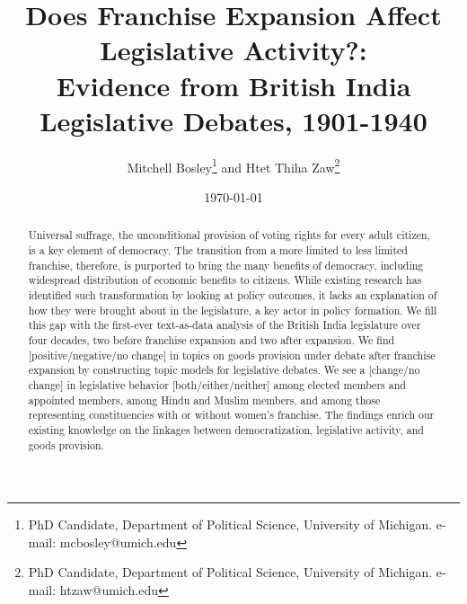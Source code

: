 \documentclass[12pt]{article}
\begin{document}
\begin{titlepage}

\setcounter{page}{1}

\title{\Large Does Franchise Expansion Affect Legislative Activity?:\\ Evidence from British India Legislative Debates, 1901-1940}
\author{Mitchell Bosley\thanks{PhD Candidate, Department of Political Science, University of Michigan. e-mail: mcbosley@umich.edu} and Htet Thiha Zaw\thanks{PhD Candidate, Department of Political Science, University of Michigan. e-mail: htzaw@umich.edu}}
\date{\today}
\maketitle
\begin{abstract}
\noindent Universal suffrage, the unconditional provision of voting rights for every adult citizen, is a key element of democracy. The transition from a more limited to less limited franchise, therefore, is purported to bring the many benefits of democracy, including widespread distribution of economic benefits to citizens. While existing research has identified such transformation by looking at policy outcomes, it lacks an explanation of how they were brought about in the legislature, a key actor in policy formation. We fill this gap with the first-ever text-as-data analysis of the British India legislature over four decades, two before franchise expansion and two after expansion. We find [positive/negative/no change] in topics on goods provision under debate after franchise expansion by constructing topic models for legislative debates. We see a [change/no change] in legislative behavior [both/either/neither] among elected members and appointed members, among Hindu and Muslim members, and among those representing constituencies with or without women's franchise. The findings enrich our existing knowledge on the linkages between democratization, legislative activity, and goods provision.\\

\bigskip
\end{abstract}
\setcounter{page}{0}
\thispagestyle{empty}
\end{titlepage}
\pagebreak \newpage

\doublespacing
\end{document}

